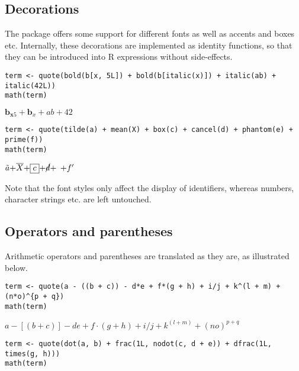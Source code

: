 \hypertarget{decorations}{%
\subsection{Decorations}\label{decorations}}

The package offers some support for different fonts as well as accents
and boxes etc. Internally, these decorations are implemented as identity
functions, so that they can be introduced into R expressions without
side-effects.

\begin{verbatim}
term <- quote(bold(b[x, 5L]) + bold(b[italic(x)]) + italic(ab) + italic(42L))
math(term)
\end{verbatim}

\({{{{\mathbf{b}}_{{\mathbf{x}}{{\mathrm{}}{5}}}}{+}{{\mathbf{b}}_{\mathit{x}}}}{+}{\mathit{ab}}}{+}{42}\)

\begin{verbatim}
term <- quote(tilde(a) + mean(X) + box(c) + cancel(d) + phantom(e) + prime(f))
math(term)
\end{verbatim}

\({{{{{\tilde{a}}{+}{\overline{X}}}{+}{\boxed{c}}}{+}{\cancel{d}}}{+}{\phantom{e}}}{+}{{f^\prime}}\)

Note that the font styles only affect the display of identifiers,
whereas numbers, character strings etc. are left untouched.

\hypertarget{operators-and-parentheses}{%
\subsection{Operators and parentheses}\label{operators-and-parentheses}}

Arithmetic operators and parentheses are translated as they are, as
illustrated below.

\begin{verbatim}
term <- quote(a - ((b + c)) - d*e + f*(g + h) + i/j + k^(l + m) + (n*o)^{p + q})
math(term)
\end{verbatim}

\({{{{{{a}{-}{\left[\left({b}{+}{c}\right)\right]}}{-}{{d}{{}}{e}}}{+}{{f}{\cdot}{\left({g}{+}{h}\right)}}}{+}{{i}{/}{j}}}{+}{{k}^{\left({l}{+}{m}\right)}}}{+}{{\left({n}{{}}{o}\right)}^{{p}{+}{q}}}\)

\begin{verbatim}
term <- quote(dot(a, b) + frac(1L, nodot(c, d + e)) + dfrac(1L, times(g, h)))
math(term)
\end{verbatim}

